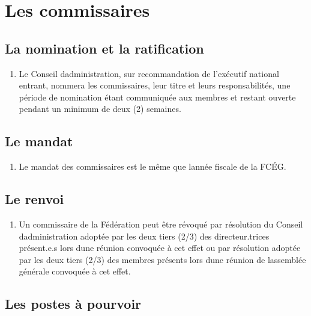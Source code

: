 \section{Les commissaires}
\label{les-commissaires}

\subsection{La nomination et la ratification}
\label{la-nomination-et-la-ratification}

\begin{enumerate}
 \item
  Le Conseil d\textquotesingle administration, sur recommandation de l'exécutif national entrant, nommera les commissaires, leur titre et leurs responsabilités, une période de nomination étant communiquée aux membres et restant ouverte pendant un minimum de deux (2) semaines.
\end{enumerate}

\subsection{Le mandat}
\label{le-mandat}

\begin{enumerate}
 \item
  Le mandat des commissaires est le même que l\textquotesingle année fiscale de la FCÉG.
\end{enumerate}

\subsection{Le renvoi}
\label{le-renvoi-3}

\begin{enumerate}
 \item
  Un commissaire de la Fédération peut être révoqué par résolution du Conseil d\textquotesingle administration adoptée par les deux tiers (2/3) des directeur.trices présent.e.s lors d\textquotesingle une réunion convoquée à cet effet ou par résolution adoptée par les deux tiers (2/3) des membres présents lors d\textquotesingle une réunion de l\textquotesingle assemblée générale convoquée à cet effet.
\end{enumerate}

\subsection{Les postes à pourvoir}
\label{les-postes-a-pourvoir-5}

